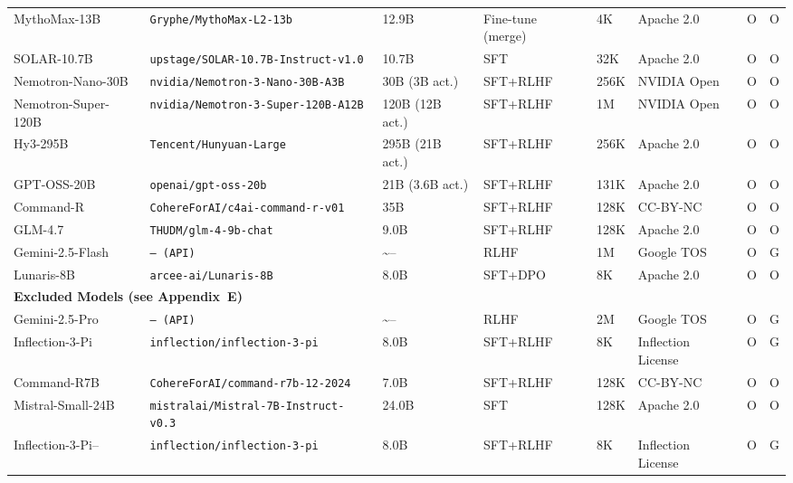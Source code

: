 \begin{table}[h]
\begin{tabular}{llllllll}
MythoMax-13B & \texttt{Gryphe/MythoMax-L2-13b} & 12.9B & Fine-tune (merge) & 4K & Apache 2.0 & O & O \\
SOLAR-10.7B & \texttt{upstage/SOLAR-10.7B-Instruct-v1.0} & 10.7B & SFT & 32K & Apache 2.0 & O & O \\
Nemotron-Nano-30B & \texttt{nvidia/Nemotron-3-Nano-30B-A3B} & 30B (3B act.) & SFT+RLHF & 256K & NVIDIA Open & O & O \\
Nemotron-Super-120B & \texttt{nvidia/Nemotron-3-Super-120B-A12B} & 120B (12B act.) & SFT+RLHF & 1M & NVIDIA Open & O & O \\
Hy3-295B & \texttt{Tencent/Hunyuan-Large} & 295B (21B act.) & SFT+RLHF & 256K & Apache 2.0 & O & O \\
GPT-OSS-20B & \texttt{openai/gpt-oss-20b} & 21B (3.6B act.) & SFT+RLHF & 131K & Apache 2.0 & O & O \\
Command-R & \texttt{CohereForAI/c4ai-command-r-v01} & 35B & SFT+RLHF & 128K & CC-BY-NC & O & O \\
GLM-4.7 & \texttt{THUDM/glm-4-9b-chat} & 9.0B & SFT+RLHF & 128K & Apache 2.0 & O & O \\
Gemini-2.5-Flash & \texttt{--- (API)} & \textasciitilde{}-- & RLHF & 1M & Google TOS & O & G \\
Lunaris-8B & \texttt{arcee-ai/Lunaris-8B} & 8.0B & SFT+DPO & 8K & Apache 2.0 & O & O \\
\midrule
\multicolumn{8}{l}{\textbf{Excluded Models (see Appendix~E)}} \\
\midrule
Gemini-2.5-Pro & \texttt{--- (API)} & \textasciitilde{}-- & RLHF & 2M & Google TOS & O & G \\
Inflection-3-Pi & \texttt{inflection/inflection-3-pi} & 8.0B & SFT+RLHF & 8K & Inflection License & O & G \\
Command-R7B & \texttt{CohereForAI/command-r7b-12-2024} & 7.0B & SFT+RLHF & 128K & CC-BY-NC & O & O \\
Mistral-Small-24B & \texttt{mistralai/Mistral-7B-Instruct-v0.3} & 24.0B & SFT & 128K & Apache 2.0 & O & O \\
Inflection-3-Pi-- & \texttt{inflection/inflection-3-pi} & 8.0B & SFT+RLHF & 8K & Inflection License & O & G \\
\bottomrule
\end{tabular}
\end{table}
